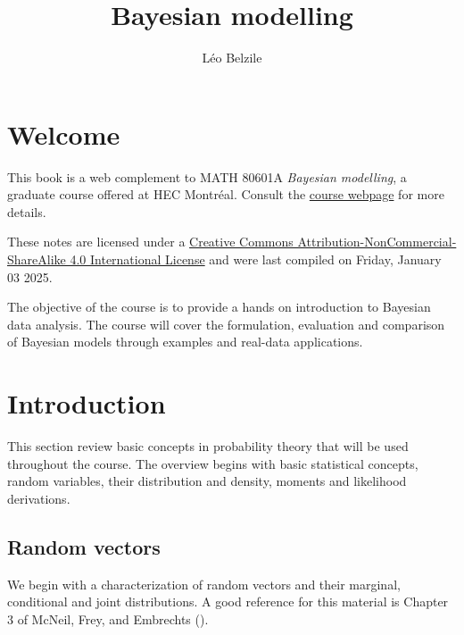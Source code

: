 \documentclass[
  11pt,
  letterpaper,
]{scrbook}
\title{Bayesian modelling}
\author{Léo Belzile}
\date{}
\renewcommand*\contentsname{Table of contents}
\newcommand\contentsname{Table of contents}
\theoremstyle{definition}
\theoremstyle{definition}
\theoremstyle{definition}
\theoremstyle{plain}
\theoremstyle{plain}
\theoremstyle{remark}
\begin{document}
\frontmatter
\maketitle

\renewcommand*\contentsname{Table of contents}
{
\setcounter{tocdepth}{2}
\tableofcontents
}

\mainmatter
{}

\chapter*{Welcome}\label{welcome}


This book is a web complement to MATH 80601A \emph{Bayesian modelling},
a graduate course offered at HEC Montréal. Consult the
\href{https://lbelzile.github.io/bayesmod}{course webpage} for more
details.

These notes are licensed under a
\href{http://creativecommons.org/licenses/by-nc-sa/4.0/}{Creative
Commons Attribution-NonCommercial-ShareAlike 4.0 International License}
and were last compiled on Friday, January 03 2025.

The objective of the course is to provide a hands on introduction to
Bayesian data analysis. The course will cover the formulation,
evaluation and comparison of Bayesian models through examples and
real-data applications.


\chapter{Introduction}\label{introduction}

This section review basic concepts in probability theory that will be
used throughout the course. The overview begins with basic statistical
concepts, random variables, their distribution and density, moments and
likelihood derivations.

\section{Random vectors}\label{random-vectors}

We begin with a characterization of random vectors and their marginal,
conditional and joint distributions. A good reference for this material
is Chapter 3 of McNeil, Frey, and Embrechts
().
\end{document}
